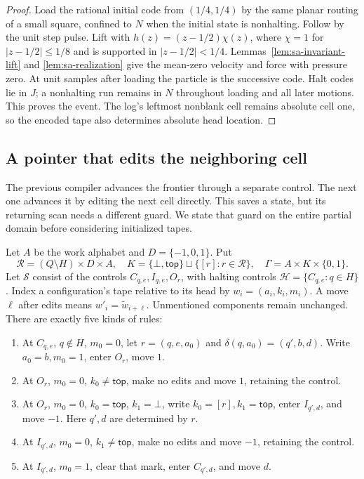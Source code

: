 \begin{proof}
Load the rational initial code from $(1/4,1/4)$ by the same planar
routing of a small square, confined to $N$ when the initial state is
nonhalting.  Follow by the unit step pulse.  Lift with
$h(z)=(z-1/2)\chi(z)$, where $\chi=1$ for $|z-1/2|\le1/8$ and is
supported in $|z-1/2|<1/4$.  Lemmas~\ref{lem:sa-invariant-lift} and
\ref{lem:sa-realization} give the mean-zero velocity and force with
pressure zero.  At unit samples after loading the particle is the
successive code.  Halt codes lie in $J$; a nonhalting run remains in
$N$ throughout loading and all later motions.  This proves the event.
The log's leftmost nonblank cell remains absolute cell one, so the
encoded tape also determines absolute head location.
\end{proof}

\subsection{A pointer that edits the neighboring cell}
\label{subsec:sa-neighbor-recorder}
The previous compiler advances the frontier through a separate control.
The next one advances it by editing the next cell directly.  This saves
a state, but its returning scan needs a different guard.  We state that
guard on the entire partial domain before considering initialized tapes.

Let $A$ be the work alphabet and $D=\{-1,0,1\}$.  Put
\[
 \mathcal R=(Q\setminus H)\times D\times A,\quad
 K=\{\bot,\mathsf{top}\}\sqcup\{[r]:r\in\mathcal R\},\quad
 \Gamma=A\times K\times\{0,1\}.
\]
Let $\mathcal S$ consist of the controls $C_{q,e},I_{q,e},O_r$,
with halting controls
$\mathcal H=\{C_{q,e}:q\in H\}$.  Index a configuration's tape relative
to its head by $w_i=(a_i,k_i,m_i)$.  A move $\ell$ after edits means
$w'_i=\widetilde w_{i+\ell}$.  Unmentioned components remain unchanged.
There are exactly five kinds of rules:
\begin{enumerate}
\item At $C_{q,e}$, $q\notin H$, $m_0=0$, let $r=(q,e,a_0)$ and
$\delta(q,a_0)=(q',b,d)$.  Write $a_0=b,m_0=1$, enter $O_r$, move $1$.
\item At $O_r$, $m_0=0$, $k_0\ne\mathsf{top}$, make no edits and move
$1$, retaining the control.
\item At $O_r$, $m_0=0$, $k_0=\mathsf{top}$, $k_1=\bot$, write
$k_0=[r],k_1=\mathsf{top}$, enter $I_{q',d}$, and move $-1$.
Here $q',d$ are determined by $r$.
\item At $I_{q',d}$, $m_0=0$, $k_1\ne\mathsf{top}$, make no edits
and move $-1$, retaining the control.
\item At $I_{q',d}$, $m_0=1$, clear that mark, enter $C_{q',d}$,
and move $d$.
\end{enumerate}

